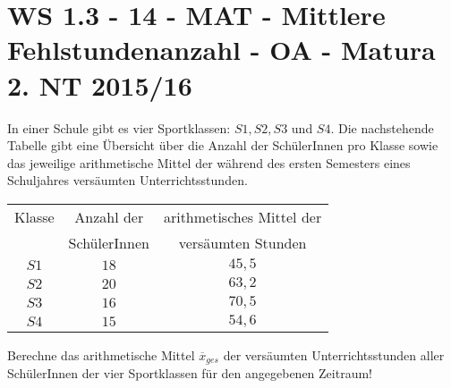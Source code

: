 \section{WS 1.3 - 14 - MAT - Mittlere Fehlstundenanzahl - OA - Matura 2. NT 2015/16}

\begin{beispiel}[WS 1.3]{1} %
In einer Schule gibt es vier Sportklassen: $S1,S2,S3$ und $S4$. Die nachstehende Tabelle gibt eine Übersicht über die Anzahl der SchülerInnen pro Klasse sowie das jeweilige arithmetische Mittel der während des ersten Semesters eines Schuljahres versäumten Unterrichtsstunden.

\begin{center}
	\begin{tabular}{|c|c|c|}\hline
	Klasse&Anzahl der&arithmetisches Mittel der\\
	&SchülerInnen&versäumten Stunden\\ \hline
	$S1$&$18$&$45,5$\\ \hline
	$S2$&$20$&$63,2$\\ \hline
	$S3$&$16$&$70,5$\\ \hline
	$S4$&$15$&$54,6$\\ \hline
	\end{tabular}
\end{center}

Berechne das arithmetische Mittel $\overline{x}_{ges}$ der versäumten Unterrichtsstunden aller SchülerInnen der vier Sportklassen für den angegebenen Zeitraum!\leer

\end{beispiel}